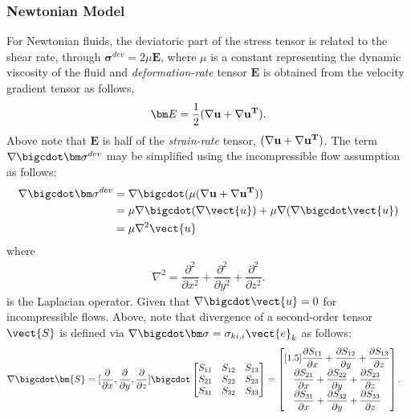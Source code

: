 \subsubsection*{Newtonian Model}
For Newtonian fluids, the deviatoric part of the stress tensor is related to the shear rate, through $\bm{\sigma}^{dev} = 2 \mu \bm E$, where $\mu$ is a constant representing the dynamic viscosity of the fluid and \textit{deformation-rate} tensor $\bm E$ is obtained from the velocity gradient tensor as follows,
\begin{align}
\bm E=\frac{1}{2}(\nabla\bf{u}+\nabla\bf{u}^T).
\label{eq:def_rate}
\end{align}
Above note that $\bm E$ is half of the \textit{strain-rate} tensor, $(\nabla\bf{u}+\nabla\bf{u}^T)$.
 The term $\nabla  \bigcdot \bm \sigma^{dev}$  may be simplified using the incompressible flow assumption as follows:
\begin{align}
\nabla  \bigcdot \bm \sigma^{dev}&=\nabla \bigcdot (\mu (\nabla\bf{u}+\nabla\bf{u}^T)) \nonumber\\
& = \mu \nabla \bigcdot (\nabla \vect{u}) + \mu \nabla (\nabla \bigcdot  \vect{u})\nonumber\\
& = \mu \nabla^2 \vect{u}
\label{eq:div_grad_u}
\end{align}
where 
\begin{align}
\nabla^2 = \dfrac{\partial^2}{\partial x^2}+\dfrac{\partial^2}{\partial y^2}+\dfrac{\partial^2}{\partial z^2}.
\label{eq:laplacian_op}
\end{align}
is the Laplacian operator. Given that $\nabla \bigcdot \vect{u}=0$ for incompressible flows.
Above, note that  divergence of a second-order tensor $\vect{S}$ is defined via $\nabla \bigcdot \bm \sigma = \sigma_{ki,i}\vect{e}_k$ as follows: 
\begin{align}
&\nabla \bigcdot \bm{S}= [\frac{\partial }{\partial x}, \frac{\partial }{\partial y},\frac{\partial }{\partial z}] \bigcdot
\begin{bmatrix}
S_{11}& S_{12}& S_{13}\\
S_{21}& S_{22}& S_{23}\\
S_{31}& S_{32}& S_{33}\\
\end{bmatrix}=
\begin{bmatrix}[1.5]
\dfrac{\partial S_{11}}{\partial x}+ \dfrac{\partial S_{12}}{\partial y}+ \dfrac{\partial S_{13}}{\partial z}\\
\dfrac{\partial S_{21}}{\partial x}+ \dfrac{\partial S_{22}}{\partial y}+ \dfrac{\partial S_{23}}{\partial z}\\
\dfrac{\partial S_{31}}{\partial x}+ \dfrac{\partial S_{32}}{\partial y}+ \dfrac{\partial S_{33}}{\partial z}
\end{bmatrix}.
\label{eq:div_S}
\end{align}
